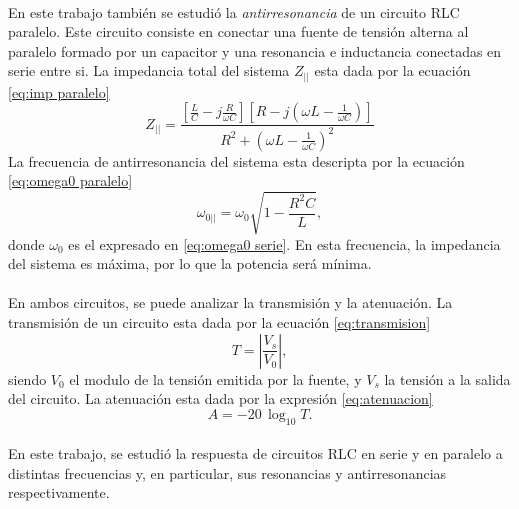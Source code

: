 \paragraph{}
En este trabajo también se estudió la \textit{antirresonancia} de un circuito RLC paralelo. Este circuito consiste en conectar una fuente de tensión alterna al paralelo formado por un capacitor y una resonancia e inductancia conectadas en serie entre si. La impedancia total del sistema $Z_{||}$ esta dada por la ecuación \eqref{eq:imp paralelo}
\begin{equation} \label{eq:imp paralelo}
    Z_{||} = \frac{\left[ \frac{L}{C} - j \frac{R}{\omega C} \right] \left[ R - j(\omega L - \frac{1}{\omega C})\right]}{R^2 + (\omega L - \frac{1}{\omega C})^2}
\end{equation}
La frecuencia de antirresonancia del sistema esta descripta por la ecuación \eqref{eq:omega0 paralelo}
\begin{equation}\label{eq:omega0 paralelo}
    \omega_{0||}=\omega_0 \sqrt{1-\frac{R^2 C}{L}},
\end{equation}
donde $\omega_0$ es el expresado en \eqref{eq:omega0 serie}. En esta frecuencia, la impedancia del sistema es máxima, por lo que la potencia será mínima.
\paragraph{}
En ambos circuitos, se puede analizar la transmisión y la atenuación. La transmisión de un circuito esta dada por la ecuación \eqref{eq:transmision}
\begin{equation}\label{eq:transmision}
    T= \left| \frac{V_s}{V_0} \right|, 
\end{equation}
siendo $V_0$ el modulo de la tensión emitida por la fuente, y $V_s$ la tensión a la salida del circuito. La atenuación esta dada por la expresión \eqref{eq:atenuacion}
\begin{equation}\label{eq:atenuacion}
    A=-20\,\log_{10}T.
\end{equation}
\paragraph{}
En este trabajo, se estudió la respuesta de circuitos RLC en serie y en paralelo a distintas frecuencias y, en particular, sus resonancias y antirresonancias respectivamente. 
